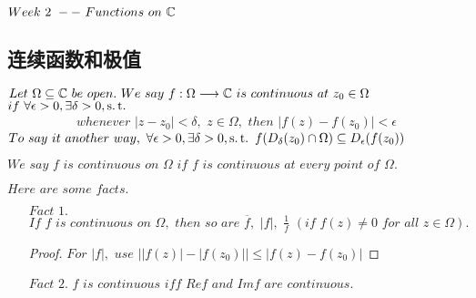 \ifx\allfiles\undefined


	\else
	\fi

\chapter{$Week \,\, 2 \,\, -- \,\, Functions \,\, on \,\, \mathbb{C}$}
\section{连续函数和极值}
\begin{defn}\label{def 2.1.1}
	$Let \,\, \Omega \subseteq \mathbb{C} \,\, be \,\, open. \,\, We \,\, say \,\, f : \Omega \longrightarrow \mathbb{C} \,\, is \,\, continuous \,\, at \,\, z_0 \in \Omega \,\, $\\
	$if \,\, \forall \epsilon > 0 , \exists \delta > 0 , \operatorname{s.t.}$
	\begin{align}
		whenever \,\, \left| z - z_0 \right| < \delta , \,\, z \in \Omega , \,\, then \,\, \left| f(z) - f(z_0) \right| < \epsilon
	\end{align}
	$To \,\, say \,\, it \,\, another \,\, way , \,\, \forall \epsilon > 0 , \exists \delta > 0 , \operatorname{s.t.} \,\, f(D_{\delta}(z_0) \cap \Omega) \subseteq D_{\epsilon}(f(z_0))$
	
	\begin{rmk}
		$We \,\, say \,\, f \,\, is \,\, continuous \,\, on \,\, \Omega \,\, if \,\, f \,\, is \,\, continuous \,\, at \,\, every \,\, point \,\, of \,\, \Omega.$
	\end{rmk}
\end{defn}

\vspace*{2em}
$Here \,\, are \,\, some \,\, facts.$
\begin{enumerate}
	\item[$Fact \,\, 1.$] $If \,\, f \,\, is \,\, continuous \,\, on \,\, \Omega , \,\, then \,\, so \,\, are \,\, \overline{f} , \,\, \left| f \right| , \,\, \frac{1}{f} \,\, (if \,\, f(z) \neq 0 \,\, for \,\, all \,\, z \in \Omega).$
	\begin{proof}
		$For \,\, \left| f \right| , \,\, use \,\, \left| \left| f(z) \right| - \left| f(z_0) \right| \right| \leq \left| f(z) - f(z_0) \right|$
	\end{proof}
	
	\item[$Fact \,\, 2.$]$f \,\, is \,\, continuous \,\, iff \,\, Ref \,\, and \,\, Imf \,\, are \,\, continuous.$
\end{enumerate}

